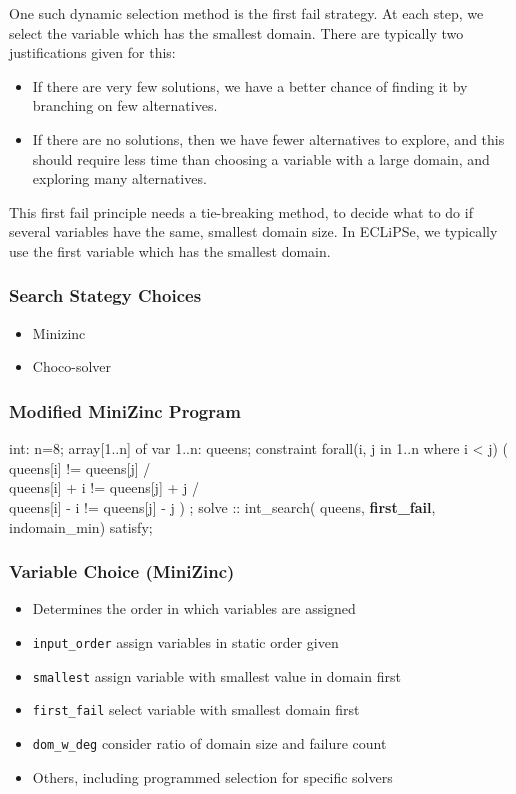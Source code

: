 One such dynamic selection method is the first fail strategy. At each step, we select the variable which has the smallest domain. There are typically two justifications given for this: 
\begin{itemize}
\item If there are very few solutions, we have a better chance of finding it by branching on few alternatives. 
\item If there are no solutions, then we have fewer alternatives to explore, and this should require less time than choosing a variable with a large domain, and exploring many alternatives.
\end{itemize}
This first fail principle needs a tie-breaking method, to decide what to do if several variables have the same, smallest domain size. In ECLiPSe, we typically use the first variable which has the smallest domain.

\begin{frame}
\frametitle{Search Stategy Choices}
\begin{itemize}
\item Minizinc \hyperlink{nqueens:minizinc mod}{}
\item Choco-solver \hyperlink{nqueens:choco mod}{}
\end{itemize}
\end{frame}


\begin{frame}[fragile]
  \frametitle{Modified MiniZinc Program}
  \label{nqueens:minizinc mod}
  \small
  \begin{semiverbatim}
int: n=8;
array[1..n] of var 1..n: queens;
constraint
    forall(i, j in 1..n where i < j) (
         queens[i] != queens[j] /\\
         queens[i] + i != queens[j] + j /\\
         queens[i] - i != queens[j] - j
    )
 ;
solve :: int\_search(
        queens,
        \textbf{first\_fail},
        indomain\_min)
        satisfy;
  \end{semiverbatim}

\end{frame}

\begin{frame}
\frametitle{Variable Choice (MiniZinc)}
\begin{itemize}
\item Determines the order in which variables are assigned
\item \texttt{input\_order} assign variables in static order given
\item \texttt{smallest} assign variable with smallest value in domain first
\item \texttt{first\_fail} select variable with smallest domain first
\item \texttt{dom\_w\_deg} consider ratio of domain size and failure count
\item Others, including programmed selection for specific solvers
\end{itemize}
\end{frame}


